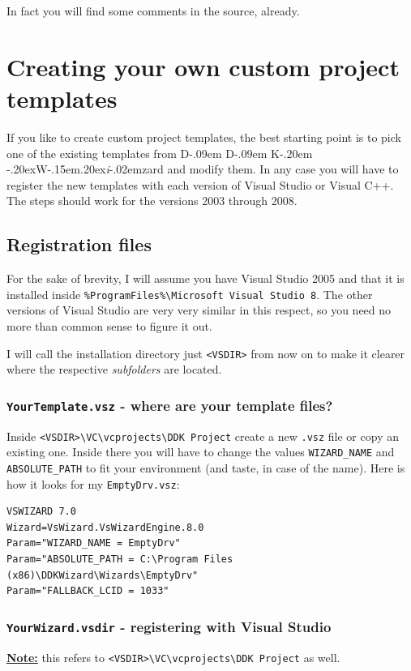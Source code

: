 \documentclass[a4paper,titlepage]{report}
\def\ddkwiz{D\kern-.09em D\kern-.09em K\kern-.20em \raise-.20ex\hbox{W}\kern-.15em\raise.20ex\hbox{\it{i}}\kern-.02em{zard}}
\begin{document}
In fact you will find some comments in the source, already.

\chapter{Creating your own custom project templates}
\label{cha:CreateOwnTemplates}
If you like to create custom project templates, the best starting point is to pick one
of the existing templates from \ddkwiz{} and modify them. In any case you will have to
register the new templates with each version of Visual Studio or Visual C++.
The steps should work for the versions 2003 through 2008.

\section{Registration files}
For the sake of brevity, I will assume you have Visual Studio 2005 and that it is installed
inside \verb+%ProgramFiles%\Microsoft Visual Studio 8+. The other versions of Visual Studio
are very very similar in this respect, so you need no more than common
sense to figure it out.

I will call the installation directory just \verb+<VSDIR>+ from now on to make it clearer
where the respective \emph{subfolders} are located.

\subsection{\texttt{YourTemplate.vsz} - where are your template files?}
Inside \verb+<VSDIR>\VC\vcprojects\DDK Project+ create a new \texttt{.vsz} file or copy
an existing one. Inside there you will have to change the values \verb+WIZARD_NAME+
and \verb+ABSOLUTE_PATH+ to fit your environment (and taste, in case of the name).
Here is how it looks for my \texttt{EmptyDrv.vsz}:\label{sec:templatepath}

\begin{verbatim}
VSWIZARD 7.0
Wizard=VsWizard.VsWizardEngine.8.0
Param="WIZARD_NAME = EmptyDrv"
Param="ABSOLUTE_PATH = C:\Program Files (x86)\DDKWizard\Wizards\EmptyDrv"
Param="FALLBACK_LCID = 1033"
\end{verbatim}

\subsection{\texttt{YourWizard.vsdir} - registering with Visual Studio}
\underline{\textbf{Note:}} this refers to \verb+<VSDIR>\VC\vcprojects\DDK Project+
as well.
\end{document}
